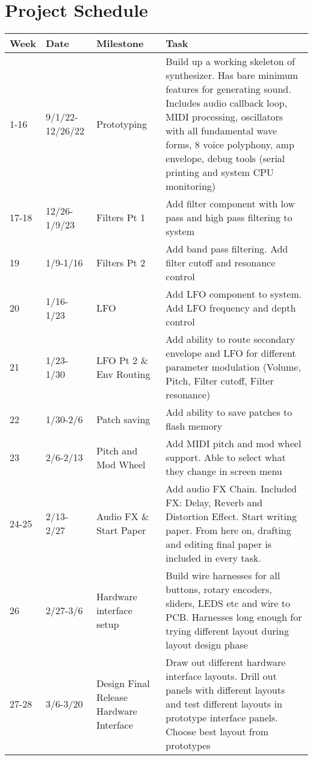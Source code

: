 \documentclass[12pt]{article}
\begin{document}
\section{Project Schedule}
\begin{longtable}{| m{4em} | m{4em} | m{8em} | m{20em} |}
\hline
Week & Date & Milestone & Task\\
\hline
\raggedright1-16 & \raggedright9/1/22-12/26/22 & Prototyping & Build up a working skeleton of synthesizer. Has bare minimum features for generating sound. Includes audio callback loop, MIDI processing, oscillators with all fundamental wave forms, 8 voice polyphony, amp envelope, debug tools (serial printing and system CPU monitoring)\\
\hline
\raggedright 17-18 & \raggedright12/26-1/9/23 & Filters Pt 1 & Add filter component with low pass and high pass filtering to system\\
\hline
\raggedright 19 & \raggedright 1/9-1/16 & Filters Pt 2 & Add band pass filtering. Add filter cutoff and resonance control\\
\hline
\raggedright 20 & \raggedright1/16-1/23 & LFO & Add LFO component to system. Add LFO frequency and depth control\\
\hline
\raggedright 21 & \raggedright 1/23-1/30 & LFO Pt 2 \& Env Routing & Add ability to route secondary envelope and LFO for different parameter modulation (Volume, Pitch, Filter cutoff, Filter resonance) \\
\hline
\raggedright 22 & \raggedright 1/30-2/6 & Patch saving & Add ability to save patches to flash memory \\
\hline
\raggedright 23 & \raggedright 2/6-2/13 & \raggedright Pitch and Mod Wheel & Add MIDI pitch and mod wheel support. Able to select what they change in screen menu \\
\hline
\raggedright 24-25 & \raggedright 2/13-2/27 & Audio FX \& Start Paper & Add audio FX Chain. Included FX: Delay, Reverb and Distortion Effect. Start writing paper. From here on, drafting and editing final paper is included in every task. \\
\hline
\raggedright 26 & \raggedright 2/27-3/6 & \raggedright Hardware interface setup & Build wire harnesses for all buttons, rotary encoders, sliders, LEDS etc and wire to PCB. Harnesses long enough for trying different layout during layout design phase \\
\hline
\raggedright 27-28 & \raggedright 3/6-3/20 & Design Final Release Hardware Interface & Draw out different hardware interface layouts. Drill out panels with different layouts and test different layouts in prototype interface panels. Choose best layout from prototypes \\

\end{longtable}
\end{document}
